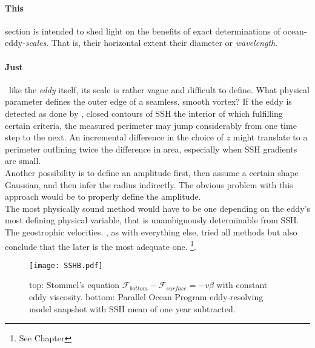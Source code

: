 \paragraph{This} section is intended to shed light on the benefits of exact determinations of ocean-eddy-\textit{scales}. That is, their horizontal extent \ie
their diameter or \textit{wavelength}.
\paragraph{Just}~like the \emph{eddy} itself, its scale is rather vague and difficult to define. What physical parameter defines the outer edge of a seamless, smooth vortex? If the eddy is detected as done by \cite{Chelton2011}, \ie closed contours of SSH the interior of which fulfilling certain criteria, the measured perimeter may jump considerably from one time step to the next. An incremental difference in the choice of $z$ might translate to a perimeter outlining twice the  difference in area, especially when SSH gradients are small.\\
Another possibility is to define an amplitude first, then assume a certain shape \eg Gaussian, and then infer the radius indirectly. The obvious problem with this approach would be to properly define the amplitude.\\
The most physically sound method would have to be one depending on the eddy's most defining physical variable, that is unambiguously determinable from SSH. The geostrophic velocities. \cite{Chelton2011}, as with everything else, tried all methods but also conclude that the later is the most adequate one. \footnote{See Chapter }.

%
\begin{wrapfigure}{r}{0.5\textwidth}
  \begin{center}
\texttt{[image: SSHB.pdf]}
  \end{center}
  \caption{top: Stommel's equation $\mathcal{F}_{bottom}-\mathcal{F}_{surface}= -v\beta$ with constant eddy viscosity. bottom: Parallel Ocean Program eddy-resolving model snapshot with SSH mean of one year subtracted. }
\end{wrapfigure}



